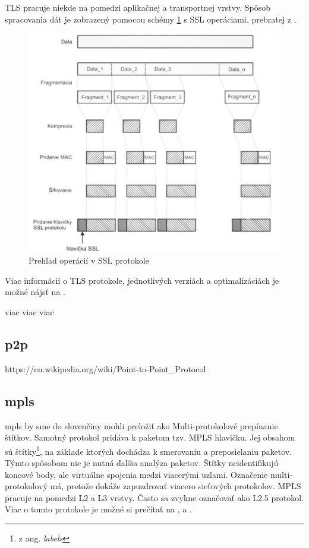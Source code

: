 TLS pracuje niekde na pomedzi aplikačnej a transportnej vrstvy. Spôsob spracovania dát je zobrazený pomocou schémy \ref{ssl} s SSL operáciami, prebratej z \cite{biks}. 
\begin{figure}[!ht]
	\centering
	\includegraphics[width=0.7\linewidth]{figures/ssl}
	\caption{Prehľad operácií v SSL protokole}
	\label{ssl}
\end{figure}

Viac informácií o TLS protokole, jednotlivých verziách a optimalizáciách je možné nájsť na \cite{tls}. 

viac viac viac

\subsection{\acrfull{p2p}}
https://en.wikipedia.org/wiki/Point-to-Point\_Protocol

\subsection{\acrfull{mpls}}
\acrshort{mpls} by sme do slovenčiny mohli preložiť ako Multi-protokolové prepínanie štítkov. Samotný protokol pridáva k paketom tzv. MPLS hlavičku. Jej obsahom sú štítky\footnote{z ang. \textit{labels}}, na základe ktorých dochádza k smerovaniu a preposielaniu paketov. Týmto spôsobom nie je nutná ďalšia analýza paketov. Štítky neidentifikujú koncové body, ale virtuálne spojenia medzi viacerými uzlami. Označenie multi-protokolový má, pretože dokáže zapuzdrovať viacero sieťových protokolov. MPLS pracuje na pomedzi L2 a L3 vrstvy. Často sa zvykne označovať ako L2.5 protokol. Viac o tomto protokole je možné si prečítať na \cite{mpls}, \cite{mplstuke} a \cite{mplsrfc}.

